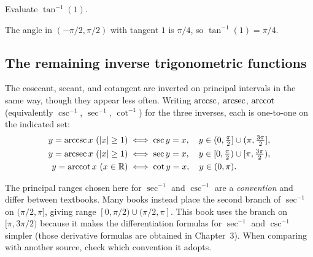 \begin{workedexample}
\begin{example}\label{ex:arctan-one}
Evaluate \(\tan^{-1}(1)\).
\end{example}

\begin{solution}
The angle in \((-\pi/2, \pi/2)\) with tangent \(1\) is \(\pi/4\), so \(\tan^{-1}(1) = \pi/4\).
\end{solution}
\end{workedexample}

\subsection{The remaining inverse trigonometric functions}

The cosecant, secant, and cotangent are inverted on principal intervals in the same way, though they appear less often. Writing \(\operatorname{arccsc}\), \(\operatorname{arcsec}\), \(\operatorname{arccot}\) (equivalently \(\csc^{-1}\), \(\sec^{-1}\), \(\cot^{-1}\)) for the three inverses, each is one-to-one on the indicated set:
\[
\begin{aligned}
y = \operatorname{arccsc} x \ (\lvert x \rvert \ge 1) &\iff \csc y = x, \quad y \in (0, \tfrac{\pi}{2}] \cup (\pi, \tfrac{3\pi}{2}], \\
y = \operatorname{arcsec} x \ (\lvert x \rvert \ge 1) &\iff \sec y = x, \quad y \in [0, \tfrac{\pi}{2}) \cup [\pi, \tfrac{3\pi}{2}), \\
y = \operatorname{arccot} x \ (x \in \mathbb{R}) &\iff \cot y = x, \quad y \in (0, \pi).
\end{aligned}
\]

\begin{caution}
The principal ranges chosen here for \(\sec^{-1}\) and \(\csc^{-1}\) are a \emph{convention} and differ between textbooks. Many books instead place the second branch of \(\sec^{-1}\) on \((\pi/2, \pi]\), giving range \([0, \pi/2) \cup (\pi/2, \pi]\). This book uses the branch on \([\pi, 3\pi/2)\) because it makes the differentiation formulas for \(\sec^{-1}\) and \(\csc^{-1}\) simpler (those derivative formulas are obtained in Chapter~3). When comparing with another source, check which convention it adopts.
\end{caution}

